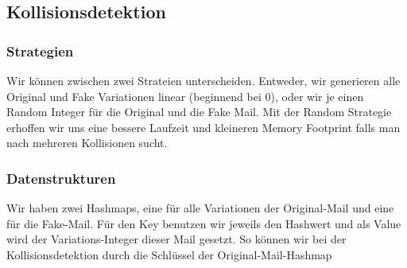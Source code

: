 \documentclass[12pt]{scrartcl}
\begin{document}
\subsection{Kollisionsdetektion}
\subsubsection{Strategien}
Wir können zwischen zwei Strateien unterscheiden. Entweder, wir generieren alle Original und Fake Variationen linear (beginnend bei 0), oder wir je einen Random Integer für die Original und die Fake Mail. Mit der Random Strategie erhoffen wir uns eine bessere Laufzeit und kleineren Memory Footprint falls man nach mehreren Kollisionen sucht.

\subsubsection{Datenstrukturen}
Wir haben zwei Hashmaps, eine für alle Variationen der Original-Mail und eine für die Fake-Mail. Für den Key benutzen wir jeweils den Hashwert und als Value wird der Variations-Integer dieser Mail gesetzt. So können wir bei der Kollisionsdetektion durch die Schlüssel der Original-Mail-Hashmap
\end{document}
